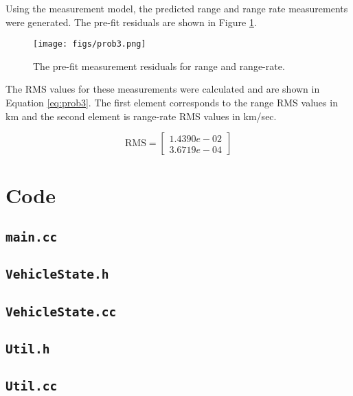 \documentclass[11pt]{article}
\begin{document}
Using the measurement model, the predicted range and range rate measurements were generated. The pre-fit residuals are shown in Figure \ref{fig:prob3}. \\

\begin{figure}[!htb]
	\centering
	\texttt{[image: figs/prob3.png]}
	\caption{The pre-fit measurement residuals for range and range-rate.}
	\label{fig:prob3}
\end{figure}

The RMS values for these measurements were calculated and are shown in Equation \eqref{eq:prob3}. The first element corresponds to the range RMS values in km and the second element is range-rate RMS values in km/sec.

\begin{equation}
\label{eq:prob3}
\text{RMS} = \begin{bmatrix}
	1.4390e-02 \\
	3.6719e-04
\end{bmatrix}
\end{equation}


\newpage
\appendix
\section{Code}

\subsection{\texttt{main.cc}}


\subsection{\texttt{VehicleState.h}}


\subsection{\texttt{VehicleState.cc}}


\subsection{\texttt{Util.h}}


\subsection{\texttt{Util.cc}}

\end{document}
